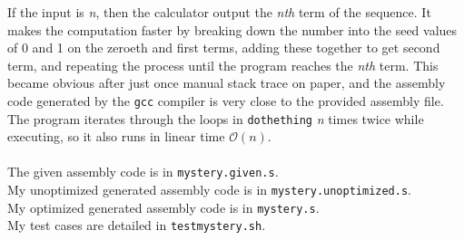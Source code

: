 \documentclass{article}
\begin{document}
If the input is \textit{n}, then the calculator output the \textit{nth} term of the sequence.  It makes the computation faster by breaking down the number into the seed values of 0 and 1 on the
zeroeth and first terms, adding these together to get second term, and repeating the process until the program reaches the \textit{nth} term.  This became obvious after just once manual
stack trace on paper, and the assembly code generated by the \verb#gcc# compiler is very close to the provided assembly file.  The
program iterates through the loops in \verb#dothething# \textit{n} times twice while executing, so it also runs in linear time $\mathcal{O}(n)$. \\\\
	The given assembly code is in \verb#mystery.given.s#.\\
	My unoptimized generated assembly code is in \verb#mystery.unoptimized.s#.\\
	My optimized generated assembly code is in \verb#mystery.s#.\\
	My test cases are detailed in \verb#testmystery.sh#.
\end{document}
